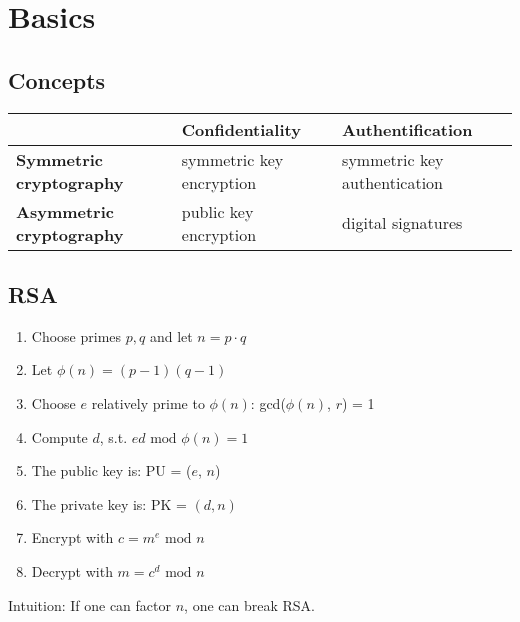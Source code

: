 
\section{Basics}
\subsection{Concepts}
\begin{tabular}{p{2.2cm}p{2.5cm}p{2.5cm}}
  \hline
	& 	\textbf{Confidentiality} & \textbf{Authentification}\\
	\hline
	\hline
  \textbf{Symmetric cryptography} & symmetric key encryption & symmetric
  key authentication\\
  \hline
  \textbf{Asymmetric cryptography} & public key encryption & digital signatures\\
  \hline
\end{tabular}
\subsection{RSA}
\begin{enumerate}
	\item Choose primes $p,q$ and let $n = p\cdot q$
	\item Let  $\phi(n) = (p-1)(q-1)$
	\item Choose $e$ relatively prime to  $\phi(n)$: gcd($\phi(n)$, $r$) = 1
      \item Compute $d$, s.t. $ed \text{ mod } \phi(n) = 1$
	\item The public key is: PU = ($e$, $n$)
	\item The private key is: PK =  $(d, n)$
	\item Encrypt with $c = m^e \text{ mod } n $
	\item Decrypt with $m = c^d \text{ mod } n$
\end{enumerate}
Intuition: If one can factor $n$, one can break RSA.
